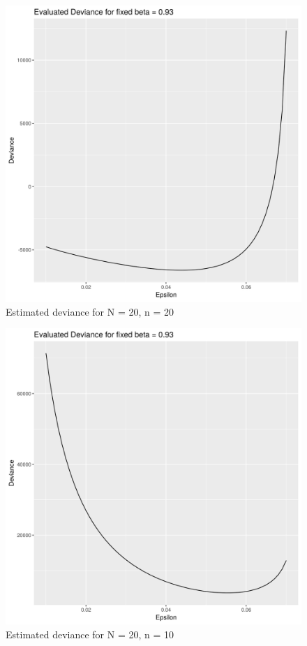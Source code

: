 \documentclass{article} %
\numberwithin{equation}{section} %
\numberwithin{figure}{section} %
\numberwithin{table}{section} %
\begin{document}
\begin{figure}[h]
\begin{center}
\includegraphics[scale = 0.5]{loglik1.png}
\caption{Estimated deviance for N = 20, n = 20}
\end{center}
\end{figure}

\begin{figure}[h]
\begin{center}
\includegraphics[scale = 0.5]{loglik2.png}
\caption{Estimated deviance for N = 20, n = 10}
\end{center}
\end{figure}
\end{document}
